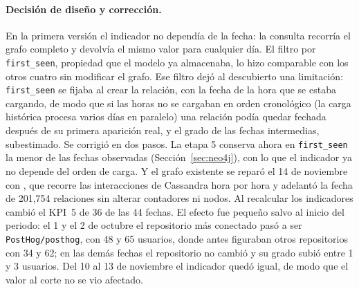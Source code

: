 \paragraph{Decisión de diseño y corrección.} En la primera versión el indicador no dependía de la fecha: la consulta recorría el grafo completo y devolvía el mismo valor para cualquier día. El filtro por \texttt{first\_seen}, propiedad que el modelo ya almacenaba, lo hizo comparable con los otros cuatro sin modificar el grafo. Ese filtro dejó al descubierto una limitación: \texttt{first\_seen} se fijaba al crear la relación, con la fecha de la hora que se estaba cargando, de modo que si las horas no se cargaban en orden cronológico (la carga histórica procesa varios días en paralelo) una relación podía quedar fechada después de su primera aparición real, y el grado de las fechas intermedias, subestimado. Se corrigió en dos pasos. La etapa 5 conserva ahora en \texttt{first\_seen} la menor de las fechas observadas (Sección~\ref{sec:neo4j}), con lo que el indicador ya no depende del orden de carga. Y el grafo existente se reparó el 14 de noviembre con , que recorre las interacciones de Cassandra hora por hora y adelantó la fecha de 201,754 relaciones sin alterar contadores ni nodos. Al recalcular los indicadores cambió el KPI~5 de 36 de las 44 fechas. El efecto fue pequeño salvo al inicio del periodo: el 1 y el 2 de octubre el repositorio más conectado pasó a ser \texttt{PostHog/posthog}, con 48 y 65 usuarios, donde antes figuraban otros repositorios con 34 y 62; en las demás fechas el repositorio no cambió y su grado subió entre 1 y 3 usuarios. Del 10 al 13 de noviembre el indicador quedó igual, de modo que el valor al corte no se vio afectado.

